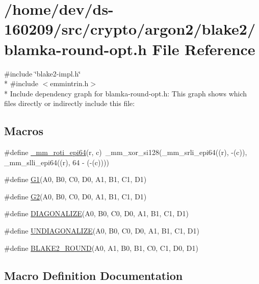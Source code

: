 \hypertarget{blamka-round-opt_8h}{}\section{/home/dev/ds-\/160209/src/crypto/argon2/blake2/blamka-\/round-\/opt.h File Reference}
\label{blamka-round-opt_8h}
{\ttfamily \#include \char`\"{}blake2-\/impl.\+h\char`\"{}}\\*
{\ttfamily \#include $<$emmintrin.\+h$>$}\\*
Include dependency graph for blamka-\/round-\/opt.h\+:
This graph shows which files directly or indirectly include this file\+:
\subsection*{Macros}
\begin{DoxyCompactItemize}
\item 
\#define \hyperlink{blamka-round-opt_8h_a4b2c5cdf0a7ce77d4b1acfe1b4fc7883}{\+\_\+mm\+\_\+roti\+\_\+epi64}(r,  c)~\+\_\+mm\+\_\+xor\+\_\+si128(\+\_\+mm\+\_\+srli\+\_\+epi64((r), -\/(c)), \+\_\+mm\+\_\+slli\+\_\+epi64((r), 64 -\/ (-\/(c))))
\item 
\#define \hyperlink{blamka-round-opt_8h_ac5393222f6177ce751b9f0426f88cfa7}{G1}(A0,  B0,  C0,  D0,  A1,  B1,  C1,  D1)
\item 
\#define \hyperlink{blamka-round-opt_8h_aa720bd2ea16e8f47866b15c03e53444d}{G2}(A0,  B0,  C0,  D0,  A1,  B1,  C1,  D1)
\item 
\#define \hyperlink{blamka-round-opt_8h_a4f5153b33e2d6c8a2a0b5084efa1fe0e}{D\+I\+A\+G\+O\+N\+A\+L\+I\+Z\+E}(A0,  B0,  C0,  D0,  A1,  B1,  C1,  D1)
\item 
\#define \hyperlink{blamka-round-opt_8h_a8c3e6d429c117a457d672f91bba5343c}{U\+N\+D\+I\+A\+G\+O\+N\+A\+L\+I\+Z\+E}(A0,  B0,  C0,  D0,  A1,  B1,  C1,  D1)
\item 
\#define \hyperlink{blamka-round-opt_8h_a49f46571273cbbead52b2085e973c5ed}{B\+L\+A\+K\+E2\+\_\+\+R\+O\+U\+N\+D}(A0,  A1,  B0,  B1,  C0,  C1,  D0,  D1)
\end{DoxyCompactItemize}


\subsection{Macro Definition Documentation}
\hypertarget{blamka-round-opt_8h_a4b2c5cdf0a7ce77d4b1acfe1b4fc7883}{}
